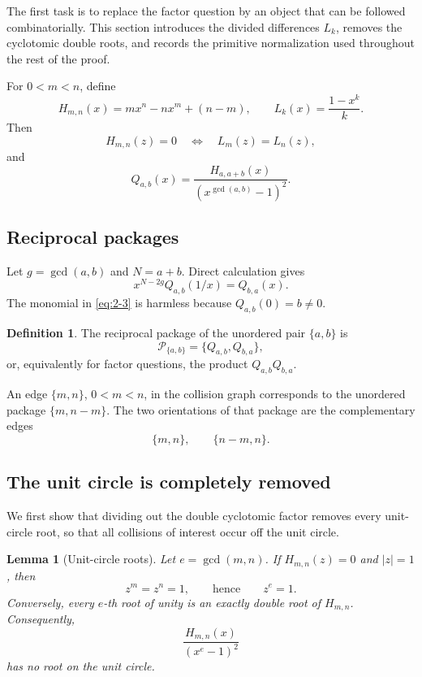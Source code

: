 \documentclass[11pt]{article}
\numberwithin{equation}{section}
\newtheorem{lemma}[theorem]{Lemma}
\theoremstyle{definition}
\newtheorem{definition}[theorem]{Definition}
\newcommand{\Package}{\mathcal P}
\begin{document}
The first task is to replace the factor question by an object that can be followed combinatorially.  This section introduces the divided differences \(L_k\), removes the cyclotomic double roots, and records the primitive normalization used throughout the rest of the proof.

For \(0<m<n\), define
\[
 H_{m,n}(x)=mx^n-nx^m+(n-m),
 \qquad
 L_k(x)=\frac{1-x^k}{k}.
\]
Then
\begin{equation}
 H_{m,n}(z)=0
 \quad\Longleftrightarrow\quad
 L_m(z)=L_n(z),
 \label{eq:2-1}
\end{equation}
and
\begin{equation}
 Q_{a,b}(x)=
 \frac{H_{a,a+b}(x)}{(x^{\gcd(a,b)}-1)^2}.
 \label{eq:2-2}
\end{equation}

\subsection{Reciprocal packages}

Let \(g=\gcd(a,b)\) and \(N=a+b\).  Direct calculation gives
\begin{equation}
 x^{N-2g}Q_{a,b}(1/x)=Q_{b,a}(x).
 \label{eq:2-3}
\end{equation}
The monomial in \eqref{eq:2-3} is harmless because \(Q_{a,b}(0)=b\neq0\).

\begin{definition}
The reciprocal package of the unordered pair \(\{a,b\}\) is
\[
 \Package_{\{a,b\}}=\{Q_{a,b},Q_{b,a}\},
\]
or, equivalently for factor questions, the product \(Q_{a,b}Q_{b,a}\).
\end{definition}

An edge \(\{m,n\}\), \(0<m<n\), in the collision graph corresponds to the
unordered package \(\{m,n-m\}\).  The two orientations of that package are the
complementary edges
\[
 \{m,n\},\qquad \{n-m,n\}.
 \label{eq:2-4}
\]

\subsection{The unit circle is completely removed}

We first show that dividing out the double cyclotomic factor removes every
unit-circle root, so that all collisions of interest occur off the unit
circle.

\begin{lemma}[Unit-circle roots]\label{lem:unitcircle}
Let \(e=\gcd(m,n)\).  If \(H_{m,n}(z)=0\) and \(|z|=1\), then
\[
 z^m=z^n=1,
 \qquad\text{hence}\qquad z^e=1.
\]
Conversely, every \(e\)-th root of unity is an exactly double root of
\(H_{m,n}\).  Consequently,
\[
 \frac{H_{m,n}(x)}{(x^e-1)^2}
\]
has no root on the unit circle.
\end{lemma}
\end{document}
